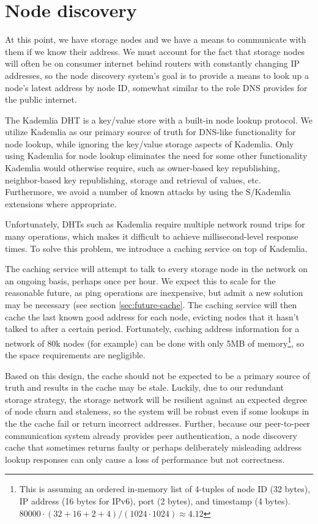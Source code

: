 \documentclass[11pt,fleqn,openany]{book}
\begin{document}
\section{Node discovery}\label{sec:concrete-node-discovery}

At this point, we have storage nodes and we have a means to communicate with
them if we know their address. We must account for the fact that storage nodes
will often be on consumer internet behind routers with constantly changing IP
addresses, so the node discovery system's goal is to provide a means to look
up a node's latest address by node ID, somewhat similar to the role DNS
provides for the public internet.

The Kademlia DHT is a key/value store with a built-in node lookup protocol.
We utilize Kademlia as our primary source of truth for DNS-like
functionality for node lookup, while ignoring the key/value storage aspects of
Kademlia.
Only using Kademlia for node lookup eliminates the need for some other
functionality Kademlia would otherwise require, such as owner-based key
republishing, neighbor-based key republishing, storage and retrieval of values,
etc. Furthermore, we avoid a number of known attacks by using the
S/Kademlia \cite{skad} extensions where appropriate.

Unfortunately, DHTs such as Kademlia require multiple network round trips for
many operations, which makes it difficult to achieve millisecond-level
response times. To solve this problem, we introduce a caching service on top
of Kademlia.

The caching service will attempt to talk to every storage node in the network
on an ongoing basis, perhaps once per hour. We expect this to scale for the
reasonable future, as ping operations are inexpensive, but admit a new solution
may be necessary (see section \ref{sec:future-cache}.
The caching service will then cache
the last known good address for each node, evicting nodes that it hasn't talked
to after a certain period.
Fortunately, caching address information for a network of 80k nodes
(for example) can be done with only 5MB of memory\footnote{
This is assuming an ordered in-memory list of 4-tuples of node ID (32 bytes),
IP address (16 bytes for IPv6), port (2 bytes), and timestamp (4 bytes).
$80000\cdot(32+16+2+4)/(1024\cdot 1024) \approx 4.12$
}, so the space requirements
are negligible.

Based on this design, the cache should not be expected to be a primary source
of truth and results in the cache may be stale. Luckily, due to our redundant
storage strategy, the storage network will be resilient against an expected
degree of node churn and staleness,
so the system will be robust even if some lookups in the the cache
fail or return incorrect addresses.
Further, because our peer-to-peer communication
system already provides peer authentication, a node discovery cache that
sometimes returns faulty
or perhaps deliberately misleading address lookup responses can only cause a
loss of performance but not correctness.
\end{document}
